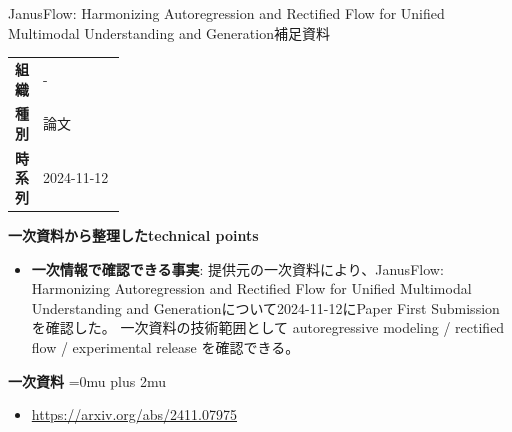 \begin{technicalnote}{JanusFlow: Harmonizing Autoregression and Rectified Flow for Unified Multimodal Understanding and Generation}{補足資料}
\begingroup
\begin{tabularx}{\linewidth}{@{}>{\bfseries}p{0.22\linewidth}X@{}}
組織 & - \\
種別 & 論文 \\
時系列 & 2024-11-12 \\
\end{tabularx}
\smallskip
{\bfseries 一次資料から整理したtechnical points}
\begin{itemize}[leftmargin=1.5em,itemsep=0.35em]
\item \textbf{一次情報で確認できる事実}: 提供元の一次資料により、JanusFlow: Harmonizing Autoregression and Rectified Flow for Unified Multimodal Understanding and Generationについて2024-11-12にPaper First Submissionを確認した。 一次資料の技術範囲として autoregressive modeling / rectified flow / experimental release を確認できる。
\end{itemize}
\begin{minipage}{\linewidth}
\begin{samepage}
{\bfseries 一次資料}
\begingroup\sloppy
\Urlmuskip=0mu plus 2mu\relax
\begin{itemize}[leftmargin=1.5em,itemsep=0.25em]
\item {\scriptsize\url{https://arxiv.org/abs/2411.07975}}
\end{itemize}
\endgroup
\end{samepage}
\end{minipage}
\endgroup
\end{technicalnote}
\medskip

